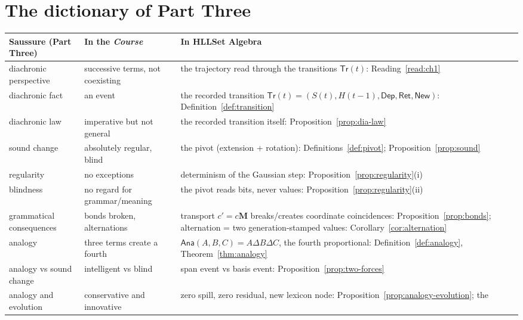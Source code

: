 \documentclass[11pt,a4paper]{article}
\theoremstyle{remark}
\newcommand{\xor}{\ensuremath{\Delta}}                   %
\newcommand{\Dep}{\ensuremath{\mathsf{Dep}}}             %
\newcommand{\Ret}{\ensuremath{\mathsf{Ret}}}             %
\newcommand{\New}{\ensuremath{\mathsf{New}}}             %
\newcommand{\Trans}{\ensuremath{\mathsf{Tr}}}            %
\newcommand{\Ana}{\ensuremath{\mathsf{Ana}}}             %
\newcommand{\Change}{\ensuremath{\mathbf{M}}}            %
\begin{document}
\section{The dictionary of Part Three}
\label{sec:dictionary}

\begin{table}[htbp]
\centering
\renewcommand{\arraystretch}{1.2}
\begin{tabular}{@{}>{\raggedright\arraybackslash}p{3.4cm}
                    >{\raggedright\arraybackslash}p{4.2cm}
                    >{\raggedright\arraybackslash}p{7.0cm}@{}}
\toprule
Saussure (Part Three) & In the \textit{Course} & In HLLSet Algebra \\
\midrule
diachronic perspective & successive terms, not coexisting & the trajectory
read through the transitions $\Trans(t)$: Reading~\ref{read:ch1} \\
diachronic fact & an event & the recorded transition
$\Trans(t)=(S(t),H(t{-}1),\Dep,\Ret,\New)$: Definition~\ref{def:transition} \\
diachronic law & imperative but not general & the recorded transition itself:
Proposition~\ref{prop:dia-law} \\
sound change & absolutely regular, blind & the pivot (extension + rotation):
Definitions~\ref{def:pivot}; Proposition~\ref{prop:sound} \\
regularity & no exceptions & determinism of the Gaussian step:
Proposition~\ref{prop:regularity}(i) \\
blindness & no regard for grammar/meaning & the pivot reads bits, never
values: Proposition~\ref{prop:regularity}(ii) \\
grammatical consequences & bonds broken, alternations & transport
$c' = c\Change$ breaks/creates coordinate coincidences:
Proposition~\ref{prop:bonds}; alternation = two generation-stamped values:
Corollary~\ref{cor:alternation} \\
analogy & three terms create a fourth & $\Ana(A,B,C)=A\xor B\xor C$, the
fourth proportional: Definition~\ref{def:analogy}, Theorem~\ref{thm:analogy} \\
analogy vs sound change & intelligent vs blind & span event vs basis event:
Proposition~\ref{prop:two-forces} \\
analogy and evolution & conservative and innovative & zero spill, zero
residual, new lexicon node: Proposition~\ref{prop:analogy-evolution}; the

\end{tabular}
\end{table}
\end{document}
